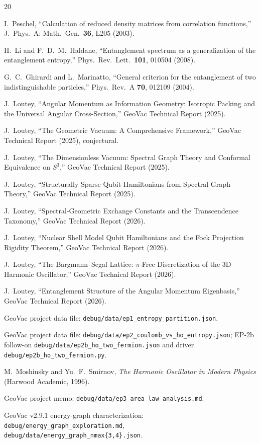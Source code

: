 \documentclass[twocolumn,pra,amsmath,amssymb,superscriptaddress]{revtex4-2}
\begin{document}
\begin{thebibliography}{20}

I.~Peschel,
``Calculation of reduced density matrices from correlation
functions,''
J.\ Phys.\ A: Math.\ Gen.\ \textbf{36}, L205 (2003).

H.~Li and F.~D.~M.~Haldane,
``Entanglement spectrum as a generalization of the entanglement
entropy,''
Phys.\ Rev.\ Lett.\ \textbf{101}, 010504 (2008).

G.~C.~Ghirardi and L.~Marinatto,
``General criterion for the entanglement of two indistinguishable
particles,''
Phys.\ Rev.\ A \textbf{70}, 012109 (2004).

J.~Loutey,
``Angular Momentum as Information Geometry: Isotropic Packing
and the Universal Angular Cross-Section,''
GeoVac Technical Report (2025).

J.~Loutey,
``The Geometric Vacuum: A Comprehensive Framework,''
GeoVac Technical Report (2025), conjectural.

J.~Loutey,
``The Dimensionless Vacuum: Spectral Graph Theory and Conformal
Equivalence on $S^{3}$,''
GeoVac Technical Report (2025).

J.~Loutey,
``Structurally Sparse Qubit Hamiltonians from Spectral Graph
Theory,''
GeoVac Technical Report (2025).

J.~Loutey,
``Spectral-Geometric Exchange Constants and the Transcendence
Taxonomy,''
GeoVac Technical Report (2026).

J.~Loutey,
``Nuclear Shell Model Qubit Hamiltonians and the Fock Projection
Rigidity Theorem,''
GeoVac Technical Report (2026).

J.~Loutey,
``The Bargmann--Segal Lattice: $\pi$-Free Discretization of the
3D Harmonic Oscillator,''
GeoVac Technical Report (2026).

J.~Loutey,
``Entanglement Structure of the Angular Momentum Eigenbasis,''
GeoVac Technical Report (2026).

GeoVac project data file:
\texttt{debug/data/ep1\_entropy\_partition.json}.

GeoVac project data file:
\texttt{debug/data/ep2\_coulomb\_vs\_ho\_entropy.json};
EP-2b follow-on
\texttt{debug/data/ep2b\_ho\_two\_fermion.json} and driver
\texttt{debug/ep2b\_ho\_two\_fermion.py}.

M.~Moshinsky and Yu.~F.~Smirnov,
\emph{The Harmonic Oscillator in Modern Physics}
(Harwood Academic, 1996).

GeoVac project memo:
\texttt{debug/data/ep3\_area\_law\_analysis.md}.

GeoVac v2.9.1 energy-graph characterization:
\texttt{debug/energy\_graph\_exploration.md},
\texttt{debug/data/energy\_graph\_nmax\{3,4\}.json}.

\end{thebibliography}
\end{document}
